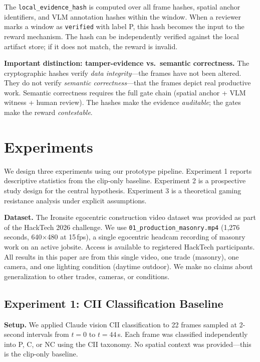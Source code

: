 \documentclass[sigconf,nonacm]{acmart}
\begin{document}
The \texttt{local\_evidence\_hash} is computed over all frame hashes, spatial anchor identifiers, and VLM annotation hashes within the window.
When a reviewer marks a window as \texttt{verified} with label P, this hash becomes the input to the reward mechanism.
The hash can be independently verified against the local artifact store; if it does not match, the reward is invalid.

\textbf{Important distinction: tamper-evidence vs.\ semantic correctness.}
The cryptographic hashes verify \emph{data integrity}---the frames have not been altered.
They do not verify \emph{semantic correctness}---that the frames depict real productive work.
Semantic correctness requires the full gate chain (spatial anchor + VLM witness + human review).
The hashes make the evidence \emph{auditable}; the gates make the reward \emph{contestable}.

\section{Experiments}
\label{sec:experiments}

We design three experiments using our prototype pipeline.
Experiment 1 reports descriptive statistics from the clip-only baseline.
Experiment 2 is a prospective study design for the central hypothesis.
Experiment 3 is a theoretical gaming resistance analysis under explicit assumptions.

\textbf{Dataset.}
The Ironsite egocentric construction video dataset was provided as part of the HackTech 2026 challenge.
We use \texttt{01\_production\_masonry.mp4} (1,276 seconds, 640$\times$480 at 15\,fps), a single egocentric headcam recording of masonry work on an active jobsite.
Access is available to registered HackTech participants.
All results in this paper are from this single video, one trade (masonry), one camera, and one lighting condition (daytime outdoor).
We make no claims about generalization to other trades, cameras, or conditions.

\subsection{Experiment 1: CII Classification Baseline}
\label{sec:exp1}

\textbf{Setup.}
We applied Claude vision CII classification to 22 frames sampled at 2-second intervals from $t = 0$ to $t = 44$\,s.
Each frame was classified independently into P, C, or NC using the CII taxonomy.
No spatial context was provided---this is the clip-only baseline.
\end{document}
